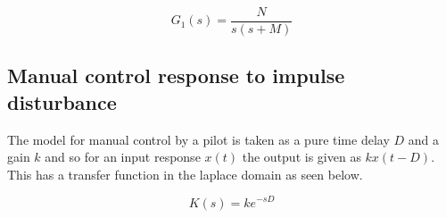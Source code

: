 \documentclass[8pt]{article}
\begin{document}
\begin{equation}
    G_1(s) = \frac{N}{s(s + M)}
\end{equation}

\subsection{Manual control response to impulse disturbance}

The model for manual control by a pilot is taken as a pure time delay $D$ and a gain $k$ and so for an input response $x(t)$ the output is given as $kx(t-D)$. This has a transfer function in the laplace domain as seen below.

\begin{equation}
    K(s) = ke^{-sD}
\end{equation}
\end{document}
